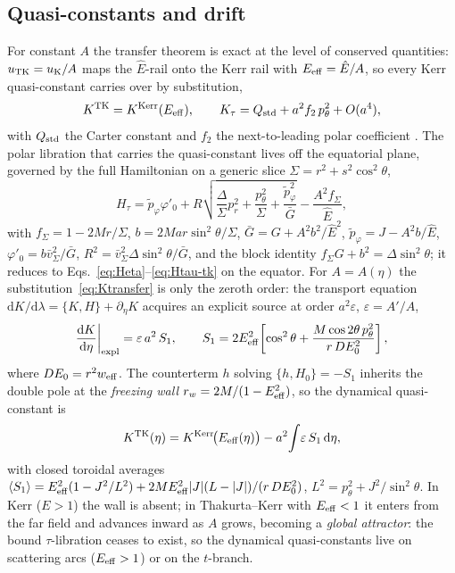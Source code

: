 \documentclass[
    aps, prd, twocolumn, superscriptaddress,
    showpacs, nofootinbib, floatfix
]{revtex4-2}
\newcommand{\Ehat}{\hat E}
\newcommand{\dd}{\mathrm{d}}
\begin{document}
\subsection{Quasi-constants and drift}
\label{sec:quasiconst}
For constant $A$ the transfer theorem is exact at the level of conserved
quantities: $u_{\rm TK}=u_{\rm K}/A$ maps the $\Ehat$-rail onto the Kerr rail with
$E_{\rm eff}=\Ehat/A$, so every Kerr quasi-constant carries over by substitution,
\begin{equation}
    K^{\rm TK}=K^{\rm Kerr}(E_{\rm eff}),\qquad
    K_\tau=Q_{\rm std}+a^2 f_2\,p_\theta^2+O(a^4),
    \label{eq:Ktransfer}
\end{equation}
with $Q_{\rm std}$ the Carter constant and $f_2$ the next-to-leading polar
coefficient \cite{Carter1968,RosignoliKerr}. The polar libration that carries the
quasi-constant lives off the equatorial plane, governed by the full Hamiltonian
on a generic slice $\Sigma=r^2+s^2\cos^2\theta$,
\begin{equation}
    H_\tau=\tilde p_\varphi\varphi'_0
      +R\sqrt{\frac{\Delta}{\Sigma}p_r^2+\frac{p_\theta^2}{\Sigma}
      +\frac{\tilde p_\varphi^2}{\bar G}}-\frac{A^2 f_\Sigma}{\Ehat},
    \label{eq:H3d}
\end{equation}
with $f_\Sigma=1-2Mr/\Sigma$, $b=2Mar\sin^2\theta/\Sigma$,
$\bar G=G+A^2 b^2/\Ehat^2$, $\tilde p_\varphi=J-A^2 b/\Ehat$,
$\varphi'_0=b\bar v_\Sigma^2/\bar G$, $R^2=\bar v_\Sigma^2\Delta\sin^2\theta/\bar G$,
and the block identity $f_\Sigma G+b^2=\Delta\sin^2\theta$; it reduces to
Eqs.~\eqref{eq:Heta}--\eqref{eq:Htau-tk} on the equator. For $A=A(\eta)$ the
substitution~\eqref{eq:Ktransfer} is only the zeroth order: the transport equation
$\dd K/\dd\lambda=\{K,H\}+\partial_\eta K$ acquires an explicit source at order
$a^2\varepsilon$, $\varepsilon=A'/A$,
\begin{equation}
    \frac{\dd K}{\dd\eta}\bigg|_{\rm expl}=\varepsilon\,a^2\,S_1,\qquad
    S_1=2E_{\rm eff}^2\!\left[\cos^2\theta
        +\frac{M\cos2\theta\,p_\theta^2}{r\,DE_0^2}\right],
    \label{eq:S1}
\end{equation}
where $DE_0=r^2 w_{\rm eff}$. The counterterm $h$ solving $\{h,H_0\}=-S_1$
inherits the double pole at the \emph{freezing wall}
$r_w=2M/(1-E_{\rm eff}^2)$, so the dynamical quasi-constant is
\begin{equation}
    K^{\rm TK}(\eta)=K^{\rm Kerr}\!\big(E_{\rm eff}(\eta)\big)
        -a^2\!\int\!\varepsilon\,S_1\,\dd\eta,
    \label{eq:Kdyn}
\end{equation}
with closed toroidal averages
$\langle S_1\rangle=E_{\rm eff}^2(1-J^2/L^2)
+2ME_{\rm eff}^2|J|(L-|J|)/(r\,DE_0^2)$, $L^2=p_\theta^2+J^2/\sin^2\theta$. In
Kerr ($E>1$) the wall is absent; in Thakurta--Kerr with $E_{\rm eff}<1$ it enters
from the far field and advances inward as $A$ grows, becoming a \emph{global
attractor}: the bound $\tau$-libration ceases to exist, so the dynamical
quasi-constants live on scattering arcs ($E_{\rm eff}>1$) or on the $t$-branch.
\end{document}
